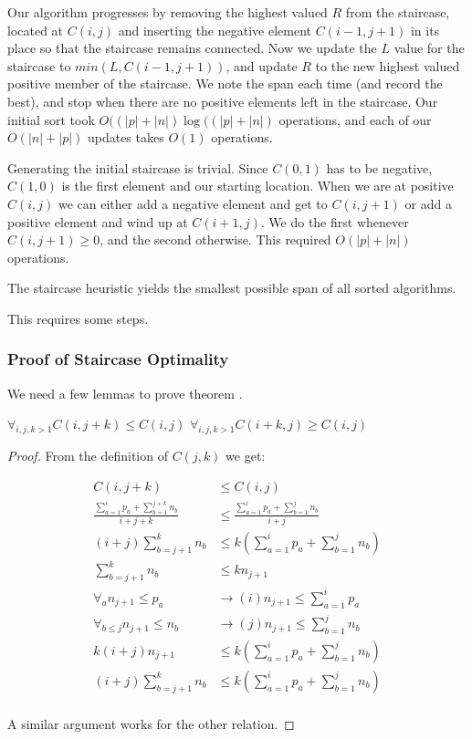 Our algorithm progresses by removing the highest valued $R$ from the staircase, located at $C(i,j)$ and inserting the negative element $C(i-1,j+1)$ in its place so that the staircase remains connected.  Now we update the $L$ value for the staircase to $min(L,C(i-1,j+1) )$, and update $R$ to the new highest valued positive member of the staircase. We note the span each time (and record the best), and stop when there are no positive elements left in the staircase.  Our initial sort took $O( (|p|+|n|) \log ((|p|+|n| )$ operations, and each of our $O(|n|+|p|)$ updates takes $O(1)$ operations.

Generating the initial staircase is trivial. Since $C(0,1)$ has to be negative, $C(1,0)$ is the first element and our starting location.  When we are at positive $C(i,j)$ we can either add a negative element and get to $C(i,j+1)$ or add a positive element and wind up at $C(i+1,j)$. We do the first whenever $C(i,j+1) \geq 0$, and the second otherwise. This required $O(|p|+ |n|)$ operations.

\begin{thm}  \label{thm:staircaseIsOpt}
The staircase heuristic yields the smallest possible span of all sorted algorithms.
\end{thm}

This requires some steps.

\subsubsection{Proof of Staircase Optimality}

We need a few lemmas to prove theorem \label{thm:staircaseIsOpt}.

\begin{lem} \label{lem:staircaseOrdering}
$\forall_{i,j,k>1} C(i,j+k) \leq C(i,j)$
$\forall_{i,j,k>1} C(i+k,j) \geq C(i,j)$
\end{lem}

\begin{proof}
From the definition of $C(j,k)$ we get:

\begin{align*}
C(i,j+k) &\leq C(i,j) \\
\frac{\sum_{a=1}^{i} p_a + \sum_{b=1}^{j+k} n_b }{i+j+k} &\leq \frac{\sum_{a=1}^{i} p_a + \sum_{b=1}^{j} n_b }{i+j} \\
(i+j)\sum_{b=j+1}^{k} n_b &\leq k(\sum_{a=1}^{i} p_a + \sum_{b=1}^{j} n_b) \\
\sum_{b=j+1}^{k} n_b &\leq k n_{j+1} \\
\forall_a n_{j+1} \leq p_a &\rightarrow (i) n_{j+1} \leq \sum_{a=1}^{i} p_a \\
\forall_{b\leq j} n_{j+1} \leq n_b &\rightarrow (j) n_{j+1} \leq \sum_{b=1}^{j} n_b \\
k(i+j)n_{j+1} &\leq k(\sum_{a=1}^{i} p_a + \sum_{b=1}^{j} n_b) \\  
(i+j)\sum_{b=j+1}^{k} n_b  &\leq k(\sum_{a=1}^{i} p_a + \sum_{b=1}^{j} n_b) \\  
\end{align*}

A similar argument works for the other relation.
\end{proof}

